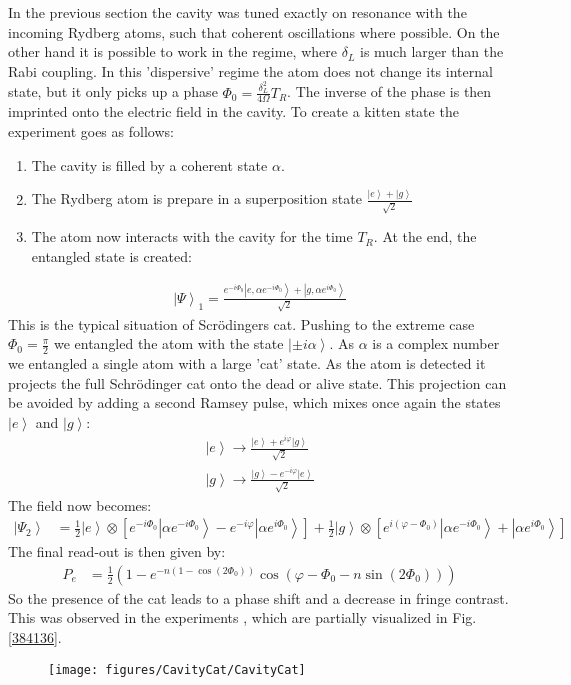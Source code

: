 \documentclass[10pt]{article}
\let\cite\citep
\providecommand\citep{\cite}
\newcommand{\ket}[1]{\ensuremath{\left|#1\right\rangle}}
\begin{document}
In the previous section the cavity was tuned exactly on resonance with the incoming Rydberg atoms, such that coherent oscillations where possible. On the other hand it is possible to work in the regime, where $\delta_L$ is much larger than the Rabi coupling. In this 'dispersive' regime the atom does not change its internal state, but it only picks up a phase $\Phi_0 =  \frac{\delta_L^2}{4\Omega} T_R$. The inverse of the phase is then imprinted onto the electric field in the cavity. To create a kitten state the experiment goes as follows:
\begin{enumerate}
\item The cavity is filled by a coherent state $\alpha$.
\item The Rydberg atom is prepare in a superposition state $\frac{\ket{e}+\ket{g}}{\sqrt{2}}$
\item The atom now interacts with the cavity for the time $T_R$. At the end, the entangled state is created:
\end{enumerate}
\begin{align}
\ket{\Psi}_1= \frac{e^{-i\Phi_0}\ket{e, \alpha e^{-i\Phi_0}}+\ket{g,\alpha e^{i\Phi_0}}}{\sqrt{2}}
\end{align}
This is the typical situation of Scrödingers cat. Pushing to the extreme case $\Phi_0 = \frac{\pi}{2}$ we entangled the atom with the state $\ket{\pm i\alpha}$. As $\alpha$ is a complex number we entangled a single atom with a large 'cat' state. As the atom is detected it projects the full Schrödinger cat onto the dead or alive state. This projection can be avoided by adding a second Ramsey pulse, which mixes once again the states $\ket{e}$ and $\ket{g}$:
\begin{align}
\ket{e}\rightarrow\frac{\ket{e}+e^{i\varphi}\ket{g}}{\sqrt{2}}\\
\ket{g}\rightarrow\frac{\ket{g}-e^{-i\varphi}\ket{e}}{\sqrt{2}}
\end{align}
The field now becomes:
\begin{align}
\ket{\Psi_2} &= \frac{1}{2}\ket{e}\otimes\left[e^{-i\Phi_0}\ket{\alpha e^{-i\Phi_0}}-e^{-i\varphi}\ket{\alpha e^{i\Phi_0}}\right]+\frac{1}{2}\ket{g}\otimes\left[e^{i(\varphi-\Phi_0)}\ket{\alpha e^{-i\Phi_0}}+\ket{\alpha e^{i\Phi_0}}\right]
\end{align}
The final read-out is then given by:
\begin{align}
P_e &= \frac{1}{2}\left(1- e^{-n(1-\cos(2\Phi_0))}\cos(\varphi-\Phi_0-n\sin(2\Phi_0))\right)
\end{align}
So the presence of the cat leads to a phase shift and a decrease in fringe contrast. This was observed in the experiments \cite{Brune_1996a}, which are partially visualized in Fig. \ref{384136}.
\begin{figure}[h!]
\begin{center}
\texttt{[image: figures/CavityCat/CavityCat]}
\caption{}
\end{center}
\end{figure}
\end{document}
